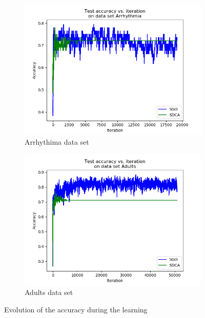 \documentclass{article}
\begin{document}
\begin{figure}[H]
	\centering
	\begin{subfigure}[t]{0.45\linewidth}
		\includegraphics[width=\linewidth]{figs/accuracy/arrhythmia.png}
		\caption{Arrhythima data set}
	\end{subfigure}
	\begin{subfigure}[t]{0.45\linewidth}
		\includegraphics[width=\linewidth]{figs/accuracy/adults.png}
		\caption{Adults data set}
	\end{subfigure}
	\caption{Evolution of the accuracy during the learning}
\end{figure}
\end{document}
